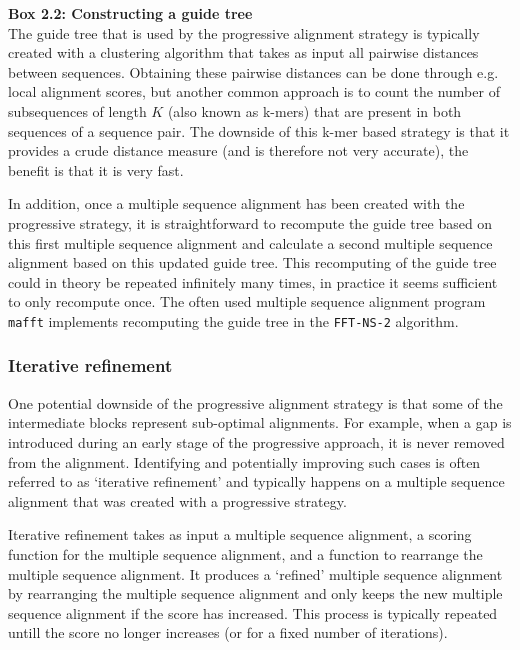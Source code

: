 \begin{framed}
\textbf{Box 2.2: Constructing a guide tree}\\
The guide tree that is used by the progressive alignment strategy is typically created with a clustering algorithm that takes as input all pairwise distances between sequences. Obtaining these pairwise distances can be done through e.g. local alignment scores, but another common approach is to count the number of subsequences of length $K$ (also known as k-mers) that are present in both sequences of a sequence pair. The downside of this k-mer based strategy is that it provides a crude distance measure (and is therefore not very accurate), the benefit is that it is very fast.

In addition, once a multiple sequence alignment has been created with the progressive strategy, it is straightforward to recompute the guide tree based on this first multiple sequence alignment and calculate a second multiple sequence alignment based on this updated guide tree. This recomputing of the guide tree could in theory be repeated infinitely many times, in practice it seems sufficient to only recompute once. The often used multiple sequence alignment program \texttt{mafft} implements recomputing the guide tree in the \texttt{FFT-NS-2} algorithm.
\end{framed}

\subsubsection{Iterative refinement}

One potential downside of the progressive alignment strategy is that some of the intermediate blocks represent sub-optimal alignments. For example, when a gap is introduced during an early stage of the progressive approach, it is never removed from the alignment. Identifying and potentially improving such cases is often referred to as `iterative refinement' and typically happens on a multiple sequence alignment that was created with a progressive strategy.

Iterative refinement takes as input a multiple sequence alignment, a scoring function for the multiple sequence alignment, and a function to rearrange the multiple sequence alignment. It produces a `refined' multiple sequence alignment by rearranging the multiple sequence alignment and only keeps the new multiple sequence alignment if the score has increased. This process is typically repeated untill the score no longer increases (or for a fixed number of iterations).

